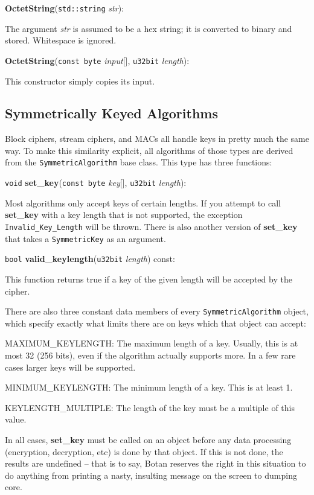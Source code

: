 \documentclass{article}
\newcommand{\function}[1]{\textbf{#1}}
\newcommand{\type}[1]{\texttt{#1}}
\renewcommand{\arg}[1]{\textsl{#1}}
\begin{document}
\noindent
\function{OctetString}(\type{std::string} \arg{str}):

The argument \arg{str} is assumed to be a hex string; it is converted to binary
and stored. Whitespace is ignored.

\noindent
\function{OctetString}(\type{const byte} \arg{input}[], \type{u32bit}
\arg{length}):

This constructor simply copies its input.

\subsection{Symmetrically Keyed Algorithms}

Block ciphers, stream ciphers, and MACs all handle keys in pretty much the same
way. To make this similarity explicit, all algorithms of those types are
derived from the \type{SymmetricAlgorithm} base class. This type has three
functions:

\noindent
\type{void} \function{set\_key}(\type{const byte} \arg{key}[], \type{u32bit}
\arg{length}):

Most algorithms only accept keys of certain lengths. If you attempt to call
\function{set\_key} with a key length that is not supported, the exception
\type{Invalid\_Key\_Length} will be thrown. There is also another version of
\function{set\_key} that takes a \type{SymmetricKey} as an argument.

\noindent
\type{bool} \function{valid\_keylength}(\type{u32bit} \arg{length}) const:

This function returns true if a key of the given length will be accepted by
the cipher.

There are also three constant data members of every \type{SymmetricAlgorithm}
object, which specify exactly what limits there are on keys which that object
can accept:

MAXIMUM\_KEYLENGTH: The maximum length of a key. Usually, this is at most 32
(256 bits), even if the algorithm actually supports more. In a few rare cases
larger keys will be supported.

MINIMUM\_KEYLENGTH: The minimum length of a key. This is at least 1.

KEYLENGTH\_MULTIPLE: The length of the key must be a multiple of this value.

In all cases, \function{set\_key} must be called on an object before any data
processing (encryption, decryption, etc) is done by that object. If this is not
done, the results are undefined -- that is to say, Botan reserves the right in
this situation to do anything from printing a nasty, insulting message on the
screen to dumping core.
\end{document}
